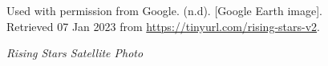 \begin{figure}[hbtp]
  \caption[Rising Stars Satellite Photo]{\textit{Rising Stars Satellite Photo}}%
  \label{fig:rising-stars-sat-photo}
  {Used with permission from Google. (n.d). [Google Earth image]. Retrieved 07 Jan 2023 from \url{https://tinyurl.com/rising-stars-v2}.}
\end{figure}

